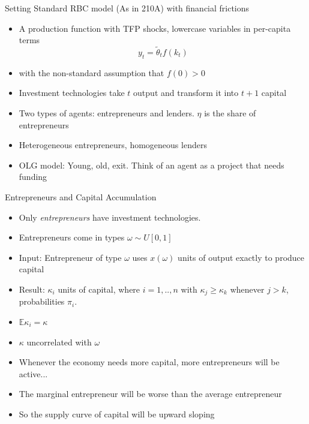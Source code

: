 \documentclass[11pt,aspectratio=169,xcolor={dvipsnames},hyperref={pdftex,pdfpagemode=UseNone,hidelinks,pdfdisplaydoctitle=true},usepdftitle=false]{beamer}
\begin{document}
\begin{frame}{Setting}
Standard RBC model (As in 210A) with financial frictions
\begin{itemize}
\item A production function with TFP shocks, lowercase variables in per-capita terms
\[y_t = \tilde{\theta}_t f(k_t) \]
\item with the non-standard assumption that $f(0) > 0 $
\item Investment technologies take $t$ output and transform it into $t+1$ capital
\item Two types of agents: entrepreneurs and lenders. $\eta$ is the share of entrepreneurs
\item Heterogeneous entrepreneurs, homogeneous lenders
\item OLG model: Young, old, exit. Think of an agent as a project that needs funding
\end{itemize}
\end{frame}

\begin{frame}{Entrepreneurs and Capital Accumulation}
\begin{itemize}
\item Only \textit{entrepreneurs} have investment technologies.
\item Entrepreneurs come in types $\omega \sim U[0,1]$
\item Input: Entrepreneur of type $\omega$ uses $x(\omega)$ units of output exactly to produce capital
\item Result: $\kappa_i$ units of capital, where  $i = 1,..,n$ with $\kappa_j \geq \kappa_k$ whenever $j > k$, probabilities $\pi_i$.
\item $\mathbb{E} \kappa_i = \kappa$
\item $\kappa$ uncorrelated with $\omega$
\item Whenever the economy needs more capital, more entrepreneurs will be active...
\item The marginal entrepreneur will be worse than the average entrepreneur
\item So the supply curve of capital will be upward sloping
\end{itemize}
\end{frame}
\end{document}
